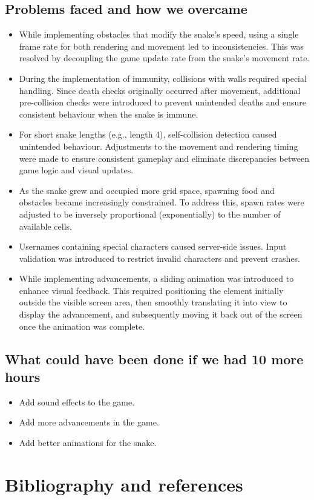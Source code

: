\documentclass{article}
\begin{document}
\subsection{Problems faced and how we overcame}
\begin{itemize}
    \item While implementing obstacles that modify the snake’s speed, using a single frame rate for both rendering and movement led to inconsistencies. This was resolved by decoupling the game update rate from the snake’s movement rate.
    \item During the implementation of immunity, collisions with walls required special handling. Since death checks originally occurred after movement, additional pre-collision checks were introduced to prevent unintended deaths and ensure consistent behaviour when the snake is immune.
    \item For short snake lengths (e.g., length 4), self-collision detection caused unintended behaviour. Adjustments to the movement and rendering timing were made to ensure consistent gameplay and eliminate discrepancies between game logic and visual updates.
    \item As the snake grew and occupied more grid space, spawning food and obstacles became increasingly constrained. To address this, spawn rates were adjusted to be inversely proportional (exponentially) to the number of available cells.
    \item Usernames containing special characters caused server-side issues. Input validation was introduced to restrict invalid characters and prevent crashes.
    \item While implementing advancements, a sliding animation was introduced to enhance visual feedback. This required positioning the element initially outside the visible screen area, then smoothly translating it into view to display the advancement, and subsequently moving it back out of the screen once the animation was complete.
\end{itemize}
\subsection{What could have been done if we had 10 more hours}
\begin{itemize}
    \item Add sound effects to the game.
    \item Add more advancements in the game.
    \item Add better animations for the snake.
\end{itemize}
\section{Bibliography and references}



\end{document}
